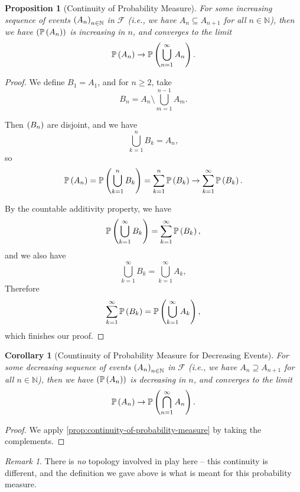 \documentclass{article}
\newtheorem{proposition}[theorem]{Proposition}
\newtheorem{corollary}[theorem]{Corollary}
\theoremstyle{definition}
\theoremstyle{remark}
\newtheorem{remark}[theorem]{Remark}
\newcommand{\NN}{\mathbb{N}}
\newcommand{\Prob}{\mathbb{P}}
\newcommand{\eventSpace}{\mathcal{F}}
\begin{document}
\begin{proposition}[Continuity of Probability Measure]
    \label{prop:continuity-of-probability-measure}%
    For some \emph{increasing} sequence of events \(\pqty{A_n}_{n \in \NN}\) in \(\eventSpace\) (i.e., we have \(A_n \subseteq A_{n + 1}\) for all \(n \in \NN\)), then we have \(\pqty{\Prob\pqty{A_n}}\) is increasing in \(n\), and converges to the limit
    \[
        \Prob\pqty{A_n} \to \Prob\pqty{\bigcup_{n = 1}^{\infty} A_n}.
    \]
\end{proposition}

\begin{proof}
    We define \(B_1 = A_1\), and for \(n \geq 2\), take
    \[
        B_n = A_n \setminus \bigcup_{m = 1}^{n - 1} A_m.
    \]

    Then \(\left(B_n\right)\) are disjoint, and we have
    \[
        \bigcup_{k = 1}^{n} B_k = A_n,
    \]
    so
    \[
        \Prob\pqty{A_n} = \Prob\pqty{\bigcup_{k = 1}^{n} B_k} = \sum_{k = 1}^{n} \Prob\pqty{B_k} \to \sum_{k = 1}^{\infty} \Prob\pqty{B_k}.
    \]

    By the countable additivity property, we have
    \[
        \Prob\pqty{\bigcup_{k = 1}^{\infty} B_k} = \sum_{k = 1}^{\infty} \Prob\pqty{B_k},
    \]
    and we also have
    \[
        \bigcup_{k = 1}^{\infty} B_k = \bigcup_{k = 1}^{\infty} A_k,
    \]
    Therefore
    \[
        \sum_{k = 1}^{\infty} \Prob\pqty{B_k} = \Prob\pqty{\bigcup_{k = 1}^{\infty} A_k},
    \]
    which finishes our proof.
\end{proof}

\begin{corollary}[Countinuity of Probability Measure for Decreasing Events]
    \label{cor:continuity-probability-measure-decreasing-sequence}%
     For some \emph{decreasing} sequence of events \(\pqty{A_n}_{n \in \NN}\) in \(\eventSpace\) (i.e., we have \(A_n \supseteq A_{n + 1}\) for all \(n \in \NN\)), then we have \(\pqty{\Prob\pqty{A_n}}\) is decreasing in \(n\), and converges to the limit
    \[
        \Prob\pqty{A_n} \to \Prob\pqty{\bigcap_{n = 1}^{\infty} A_n}.
    \]
\end{corollary}

\begin{proof}
    We apply \autoref{prop:continuity-of-probability-measure} by taking the complements.
\end{proof}

\begin{remark}
    There is \emph{no} topology involved in play here -- this continuity is different, and the definition we gave above is what is meant for this probability measure.
\end{remark}
\end{document}
